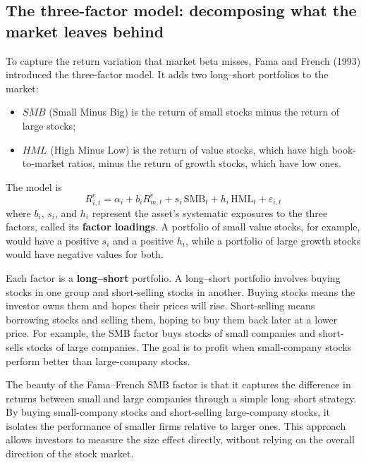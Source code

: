 \subsection{The three-factor model: decomposing what the market leaves behind}
\label{sec:03-factors}
To capture the return variation that market beta misses, Fama and French (1993) introduced the three-factor model. It adds two long--short portfolios to the market:
\begin{itemize}
  \item $SMB$ (Small Minus Big) is the return of small stocks minus the return of large stocks;
  \item $HML$ (High Minus Low) is the return of value stocks, which have high book-to-market ratios, minus the return of growth stocks, which have low ones.
\end{itemize}
The model is
\begin{equation}
  R^{e}_{i,t} = \alpha_i + b_i R^{e}_{m,t} + s_i \,\mathrm{SMB}_t + h_i \,\mathrm{HML}_t + \varepsilon_{i,t}
  \label{eq:03-ff3}
\end{equation}
where $b_i$, $s_i$, and $h_i$ represent the asset's systematic exposures to the three factors, called its \textbf{factor loadings}. A portfolio of small value stocks, for example, would have a positive $s_i$ and a positive $h_i$, while a portfolio of large growth stocks would have negative values for both.

Each factor is a \textbf{long--short} portfolio. 
A long--short portfolio involves buying stocks in one group and short-selling stocks in another. Buying stocks means the investor owns them and hopes their prices will rise. Short-selling means borrowing stocks and selling them, hoping to buy them back later at a lower price. For example, the SMB factor buys stocks of small companies and short-sells stocks of large companies. The goal is to profit when small-company stocks perform better than large-company stocks.

The beauty of the Fama--French SMB factor is that it captures the difference in returns between small and large companies through a simple long--short strategy. By buying small-company stocks and short-selling large-company stocks, it isolates the performance of smaller firms relative to larger ones. This approach allows investors to measure the size effect directly, without relying on the overall direction of the stock market.

